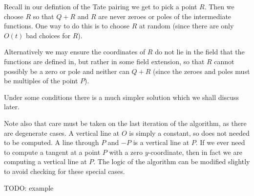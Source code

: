 Recall in our defintion of the Tate pairing we get to pick a point $R$.
Then we choose $R$ so that $Q+R$ and $R$ are never zeroes or poles
of the intermediate functions. One way to do this is to choose
$R$ at random (since there are only $O(t)$ bad choices for $R$).

Alternatively we may ensure the coordinates of $R$ do not lie in the
field that the functions are defined in, but rather in some field
extension, so that
$R$ cannot possibly be a zero or pole and neither can $Q + R$ (since the
zeroes and poles must be multiples of the point $P$).

Under some conditions there is a much simpler solution which we shall
discuss later.

Note also that care must be taken on the last iteration of the algorithm,
as there are degenerate cases. A vertical line at $O$ is simply a constant,
so does not needed to be computed. A line through $P$ and $-P$ is a vertical
line at $P$. If we ever need to compute a tangent at a point $P$ with a zero
$y$-coordinate, then in fact we are computing a vertical line at $P$.
The logic of the algorithm can be modified slightly to avoid checking
for these special cases.

TODO: example
